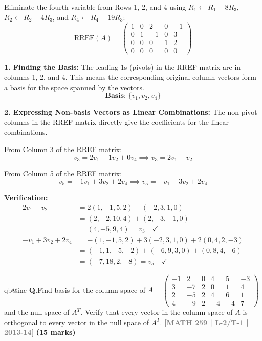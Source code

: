 \documentclass[12pt,a3paper]{article}
\makeatletter
\newcommand{\yr}[1]{\hfill\textcolor{gray}{\small\textbf{[#1]}}}
\newcommand{\mk}[1]{\textcolor{orange!70!black}{\small\textbf{(#1 marks)}}}
\newcounter{qnum}
\newcommand{\Q}[1]{%
  \csname qb@inc\endcsname
  \needspace{4\baselineskip}
  \refstepcounter{qnum}
  \vspace{6pt}
  \noindent\textbf{Q\theqnum.}\enspace #1\par
}
\makeatother
\begin{document}
\begin{tcolorbox}[enhanced,breakable,
  colback=cC!4,colframe=cC,boxrule=0.8pt,arc=5pt,
  title={\textbf{Answer --- Basis and Linear Combinations}},
  fonttitle=\bfseries\color{white},colbacktitle=cC]
Eliminate the fourth variable from Rows 1, 2, and 4 using $R_1 \leftarrow R_1 - 8R_3$, $R_2 \leftarrow R_2 - 4R_3$, and $R_4 \leftarrow R_4 + 19R_3$:
\[
\text{RREF}(A) = \begin{pmatrix}
1 & 0 & 2 & 0 & -1 \\
0 & 1 & -1 & 0 & 3 \\
0 & 0 & 0 & 1 & 2 \\
0 & 0 & 0 & 0 & 0
\end{pmatrix}
\]

\textbf{1. Finding the Basis:}
The leading 1s (pivots) in the RREF matrix are in columns 1, 2, and 4. This means the corresponding original column vectors form a basis for the space spanned by the vectors.
\[
\textbf{Basis: } \{v_1, v_2, v_4\}
\]

\textbf{2. Expressing Non-basis Vectors as Linear Combinations:}
The non-pivot columns in the RREF matrix directly give the coefficients for the linear combinations. 

From Column 3 of the RREF matrix:
\[
v_3 = 2v_1 - 1v_2 + 0v_4 \implies \boxed{v_3 = 2v_1 - v_2}
\]

From Column 5 of the RREF matrix:
\[
v_5 = -1v_1 + 3v_2 + 2v_4 \implies \boxed{v_5 = -v_1 + 3v_2 + 2v_4}
\]

\vspace{0.5cm}
\textbf{Verification:}
\begin{align*}
2v_1 - v_2 &= 2(1,-1,5,2) - (-2,3,1,0) \\
           &= (2,-2,10,4) + (2,-3,-1,0) \\
           &= (4,-5,9,4) = v_3 \quad \checkmark \\[1ex]
-v_1 + 3v_2 + 2v_4 &= -(1,-1,5,2) + 3(-2,3,1,0) + 2(0,4,2,-3) \\
                   &= (-1,1,-5,-2) + (-6,9,3,0) + (0,8,4,-6) \\
                   &= (-7,18,2,-8) = v_5 \quad \checkmark
\end{align*}

\end{tcolorbox}

\Q{Find basis for the column space of $A = \begin{pmatrix} -1 & 2 & 0 & 4 & 5 & -3 \\ 3 & -7 & 2 & 0 & 1 & 4 \\ 2 & -5 & 2 & 4 & 6 & 1 \\ 4 & -9 & 2 & -4 & -4 & 7 \end{pmatrix}$ and the null space of $A^T$. Verify that every vector in the column space of $A$ is orthogonal to every vector in the null space of $A^T$.
\yr{MATH 259 | L-2/T-1 | 2013-14} \mk{15}}
\end{document}
